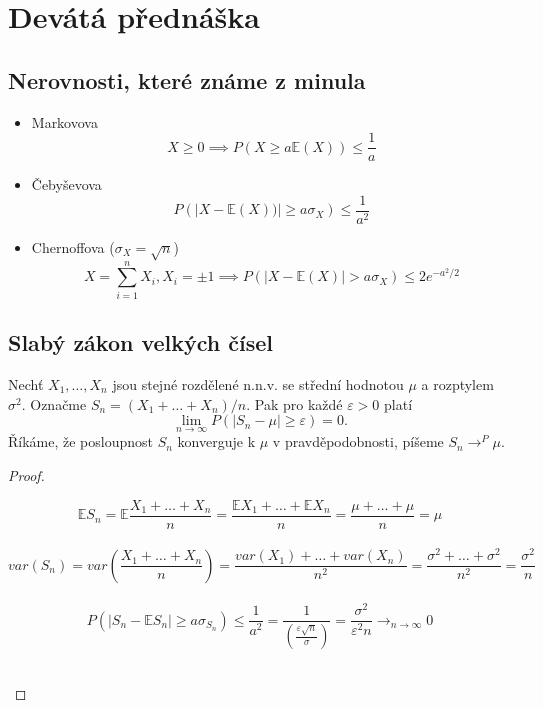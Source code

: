 \documentclass[../main.tex]{subfiles}
\begin{document}
\section{Devátá přednáška}

\subsection{Nerovnosti, které známe z minula}
\begin{itemize}
    \item Markovova
    \[X\geq 0 \implies P(X\geq a\mathbb{E}(X))\leq \frac{1}{a}\]
    \item Čebyševova
    \[P(|X-\mathbb{E}(X))|\geq a\sigma_X)\leq \frac{1}{a^2}\]
    \item Chernoffova ($\sigma_X = \sqrt{n}$)
    \[X = \sum^n_{i=1}X_i,X_i = \pm 1 \implies P(|X-\mathbb{E}(X)|> a\sigma_X)\leq 2e^{-a^2/2}\]
\end{itemize}

\subsection{Slabý zákon velkých čísel}
\begin{theorem}
    Nechť $X_1,\dots ,X_n$ jsou stejné rozdělené n.n.v. se střední hodnotou $\mu$ a rozptylem $\sigma^2$.
    Označme $S_n = (X_1 + \dots + X_n)/n$.
    Pak pro každé $\varepsilon > 0$ platí
    \[\lim_{n\rightarrow \infty} P(|S_n - \mu | \geq \varepsilon) = 0.\]
    Říkáme, že posloupnost $S_n$ konverguje k $\mu$ v pravděpodobnosti, píšeme $S_n \rightarrow^P \mu$.
\end{theorem}
\begin{proof}
    \begin{center}
        \[\mathbb{E}S_n = \mathbb{E}\frac{X_1 + \dots + X_n}{n} = \frac{\mathbb{E}X_1 + \dots + \mathbb{E}X_n}{n}
         = \frac{\mu + \dots + \mu}{n} = \mu\]\\
        \[var(S_n) = var \left(\frac{X_1 + \dots + X_n}{n}\right) = \frac{var(X_1) + \dots + var(X_n)}{n^2} 
        = \frac{\sigma^2 + \dots + \sigma^2}{n^2} = \frac{\sigma^2}{n}\]\\
        \[P(|S_n - \mathbb{E}S_n | \geq a\sigma_{S_n}) \leq \frac{1}{a^2} = \frac{1}{\left(\frac{\varepsilon \sqrt{n}}{\sigma}\right)} =
        \frac{\sigma^2}{\varepsilon^2 n} \rightarrow_{n\rightarrow \infty} 0\]\\
    \end{center}
\end{proof}
\end{document}

